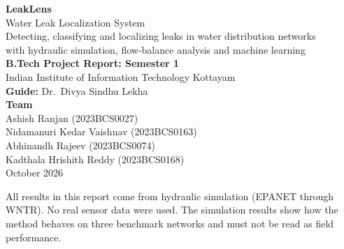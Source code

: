 \documentclass[11pt,a4paper]{article}
\begin{document}
\begin{titlepage}
\centering\vspace*{2.2cm}
{\Huge\bfseries\color{navy} LeakLens}\\[6pt]
{\LARGE Water Leak Localization System}\\[1.2cm]
{\Large Detecting, classifying and localizing leaks in water distribution networks\\ with hydraulic simulation, flow-balance analysis and machine learning}\\[1.6cm]
{\large\bfseries B.Tech Project Report: Semester 1}\\[0.4cm]
Indian Institute of Information Technology Kottayam\\[1.0cm]
\textbf{Guide:} Dr.\ Divya Sindhu Lekha\\[0.6cm]
\textbf{Team}\\
Ashish Ranjan (2023BCS0027)\\
Nidamanuri Kedar Vaishnav (2023BCS0163)\\
Abhinandh Rajeev (2023BCS0074)\\
Kadthala Hrishith Reddy (2023BCS0168)\\[1.2cm]
October 2026\\[1.5cm]
\begin{minipage}{0.85\linewidth}\small
All results in this report come from hydraulic simulation (EPANET through WNTR). No real sensor data were used. The simulation results show how the method behaves on three benchmark networks and must not be read as field performance.
\end{minipage}
\end{titlepage}
\end{document}
